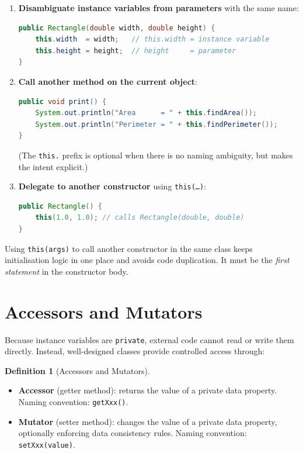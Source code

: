 \documentclass[11pt, a4paper, notitlepage]{report}
\theoremstyle{definition}
\newtheorem{definition}[theorem]{Definition}
\theoremstyle{remark}
\theoremstyle{definition}
\begin{document}
\begin{enumerate}
  \item \textbf{Disambiguate instance variables from parameters} with the same name:
\begin{lstlisting}[language=Java]
public Rectangle(double width, double height) {
    this.width  = width;   // this.width = instance variable
    this.height = height;  // height     = parameter
}
\end{lstlisting}

  \item \textbf{Call another method on the current object}:
\begin{lstlisting}[language=Java]
public void print() {
    System.out.println("Area      = " + this.findArea());
    System.out.println("Perimeter = " + this.findPerimeter());
}
\end{lstlisting}
  (The \texttt{this.} prefix is optional when there is no naming ambiguity, but makes the intent explicit.)

  \item \textbf{Delegate to another constructor} using \texttt{this(\ldots)}:
\begin{lstlisting}[language=Java]
public Rectangle() {
    this(1.0, 1.0); // calls Rectangle(double, double)
}
\end{lstlisting}
\end{enumerate}

\begin{examtip}[title={Exam Tip: Constructor Delegation}]
Using \texttt{this(args)} to call another constructor in the same class keeps initialisation logic in one place and avoids code duplication. It must be the \emph{first statement} in the constructor body.
\end{examtip}

\section{Accessors and Mutators}
\label{sec:ch2-accessors-mutators}

Because instance variables are \texttt{private}, external code cannot read or write them directly. Instead, well-designed classes provide controlled access through:

\begin{definition}[Accessors and Mutators]
\label{def:ch2-accessors-mutators}
\begin{itemize}
  \item \textbf{Accessor} (getter method): returns the value of a private data property. Naming convention: \texttt{getXxx()}.
  \item \textbf{Mutator} (setter method): changes the value of a private data property, optionally enforcing data consistency rules. Naming convention: \texttt{setXxx(value)}.
\end{itemize}
\end{definition}
\end{document}
